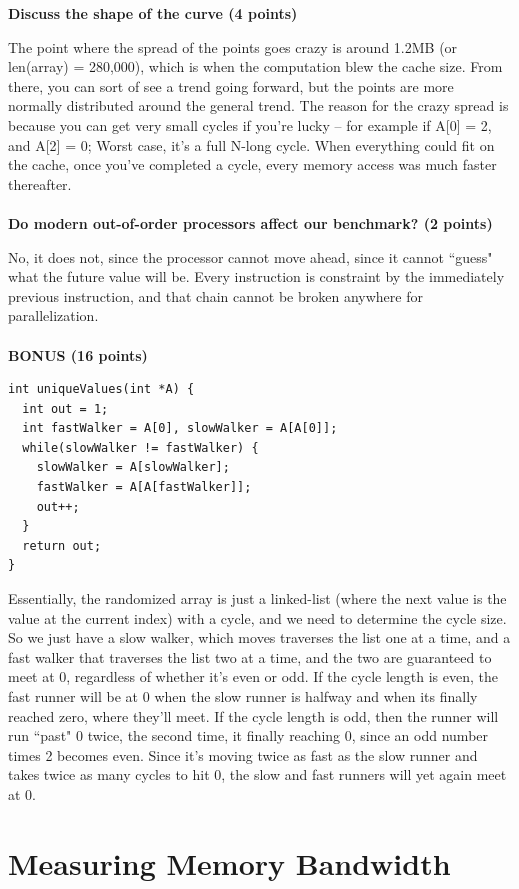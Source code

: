 \documentclass{article}
\begin{document}
\textbf{Discuss the shape of the curve (4 points)}

The point where the spread of the points goes crazy is around 1.2MB (or len(array) = 280,000), which is when the computation blew the cache size. From there, you can sort of see a trend going forward, but the points are more normally distributed around the general trend. The reason for the crazy spread is because you can get very small cycles if you're lucky -- for example if A[0] = 2, and A[2] = 0; Worst case, it's a full N-long cycle. When everything could fit on the cache, once you've completed a cycle, every memory access was much faster thereafter.\\\\

\textbf{Do modern out-of-order processors affect our benchmark? (2 points)}

No, it does not, since the processor cannot move ahead, since it cannot ``guess" what the future value will be. Every instruction is constraint by the immediately previous instruction, and that chain cannot be broken anywhere for parallelization.\\\\

\textbf{BONUS (16 points)}

\begin{lstlisting}
int uniqueValues(int *A) {
  int out = 1;
  int fastWalker = A[0], slowWalker = A[A[0]];
  while(slowWalker != fastWalker) {
    slowWalker = A[slowWalker];
    fastWalker = A[A[fastWalker]];
    out++;
  }
  return out;
}
\end{lstlisting}

Essentially, the randomized array is just a linked-list (where the next value is the value at the current index) with a cycle, and we need to determine the cycle size. So we just have a slow walker, which moves traverses the list one at a time, and a fast walker that traverses the list two at a time, and the two are guaranteed to meet at 0, regardless of whether it's even or odd. If the cycle length is even, the fast runner will be at 0 when the slow runner is halfway and when its finally reached zero, where they'll meet. If the cycle length is odd, then the runner will run ``past" 0 twice, the second time, it finally reaching 0, since an odd number times 2 becomes even. Since it's moving twice as fast as the slow runner and takes twice as many cycles to hit 0, the slow and fast runners will yet again meet at 0.

\section{Measuring Memory Bandwidth}
\end{document}
